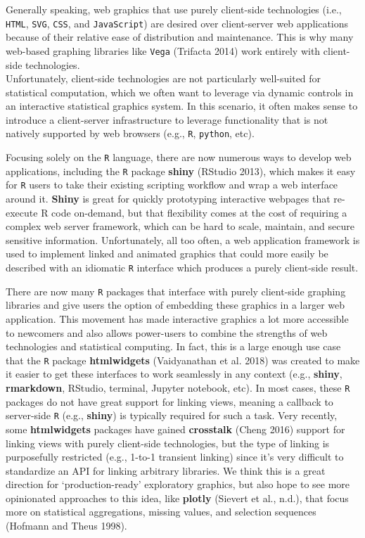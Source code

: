 \documentclass[12pt,]{article}
\theoremstyle{definition}
\theoremstyle{definition}
\theoremstyle{definition}
\theoremstyle{remark}
\begin{document}
Generally speaking, web graphics that use purely client-side
technologies (i.e., \texttt{HTML}, \texttt{SVG}, \texttt{CSS}, and
\texttt{JavaScript}) are desired over client-server web applications
because of their relative ease of distribution and maintenance. This is
why many web-based graphing libraries like \texttt{Vega} (Trifacta 2014)
work entirely with client-side technologies.\\
Unfortunately, client-side technologies are not particularly well-suited
for statistical computation, which we often want to leverage via dynamic
controls in an interactive statistical graphics system. In this
scenario, it often makes sense to introduce a client-server
infrastructure to leverage functionality that is not natively supported
by web browsers (e.g., \texttt{R}, \texttt{python}, etc).

Focusing solely on the \texttt{R} language, there are now numerous ways
to develop web applications, including the \texttt{R} package
\textbf{shiny} (RStudio 2013), which makes it easy for \texttt{R} users
to take their existing scripting workflow and wrap a web interface
around it. \textbf{Shiny} is great for quickly prototyping interactive
webpages that re-execute R code on-demand, but that flexibility comes at
the cost of requiring a complex web server framework, which can be hard
to scale, maintain, and secure sensitive information. Unfortunately, all
too often, a web application framework is used to implement linked and
animated graphics that could more easily be described with an idiomatic
\texttt{R} interface which produces a purely client-side result.

There are now many \texttt{R} packages that interface with purely
client-side graphing libraries and give users the option of embedding
these graphics in a larger web application. This movement has made
interactive graphics a lot more accessible to newcomers and also allows
power-users to combine the strengths of web technologies and statistical
computing. In fact, this is a large enough use case that the \texttt{R}
package \textbf{htmlwidgets} (Vaidyanathan et al. 2018) was created to
make it easier to get these interfaces to work seamlessly in any context
(e.g., \textbf{shiny}, \textbf{rmarkdown}, RStudio, terminal, Jupyter
notebook, etc). In most cases, these \texttt{R} packages do not have
great support for linking views, meaning a callback to server-side
\texttt{R} (e.g., \textbf{shiny}) is typically required for such a task.
Very recently, some \textbf{htmlwidgets} packages have gained
\textbf{crosstalk} (Cheng 2016) support for linking views with purely
client-side technologies, but the type of linking is purposefully
restricted (e.g., 1-to-1 transient linking) since it's very difficult to
standardize an API for linking arbitrary libraries. We think this is a
great direction for `production-ready' exploratory graphics, but also
hope to see more opinionated approaches to this idea, like
\textbf{plotly} (Sievert et al., n.d.), that focus more on statistical
aggregations, missing values, and selection sequences (Hofmann and Theus
1998).
\end{document}
